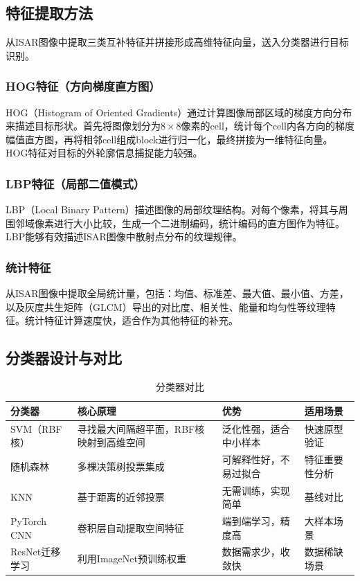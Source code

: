 \documentclass[12pt, a4paper]{article}
\begin{document}
\subsection{特征提取方法}

从ISAR图像中提取三类互补特征并拼接形成高维特征向量，送入分类器进行目标识别。

\subsubsection{HOG特征（方向梯度直方图）}

HOG（Histogram of Oriented Gradients）通过计算图像局部区域的梯度方向分布来描述目标形状\cite{ref_hog}。首先将图像划分为$8\times8$像素的cell，统计每个cell内各方向的梯度幅值直方图，再将相邻cell组成block进行归一化，最终拼接为一维特征向量。HOG特征对目标的外轮廓信息捕捉能力较强。

\subsubsection{LBP特征（局部二值模式）}

LBP（Local Binary Pattern）描述图像的局部纹理结构。对每个像素，将其与周围邻域像素进行大小比较，生成一个二进制编码，统计编码的直方图作为特征。LBP能够有效描述ISAR图像中散射点分布的纹理规律。

\subsubsection{统计特征}

从ISAR图像中提取全局统计量，包括：均值、标准差、最大值、最小值、方差，以及灰度共生矩阵（GLCM）导出的对比度、相关性、能量和均匀性等纹理特征。统计特征计算速度快，适合作为其他特征的补充。

\subsection{分类器设计与对比}

\begin{table}[H]
\centering
\begin{tabularx}{\textwidth}{lLLL}
\toprule
{}\color{white}\bfseries 分类器 &
  \color{white}\bfseries 核心原理 &
  \color{white}\bfseries 优势 &
  \color{white}\bfseries 适用场景 \\
\midrule
SVM（RBF核） & 寻找最大间隔超平面，RBF核映射到高维空间 & 泛化性强，适合中小样本 & 快速原型验证 \\
随机森林 & 多棵决策树投票集成 & 可解释性好，不易过拟合 & 特征重要性分析 \\
KNN & 基于距离的近邻投票 & 无需训练，实现简单 & 基线对比 \\
PyTorch CNN & 卷积层自动提取空间特征 & 端到端学习，精度高 & 大样本场景 \\
ResNet迁移学习 & 利用ImageNet预训练权重 & 数据需求少，收敛快 & 数据稀缺场景 \\
\bottomrule
\end{tabularx}
\caption{分类器对比}
\label{tab:classifiers}
\end{table}
\end{document}
